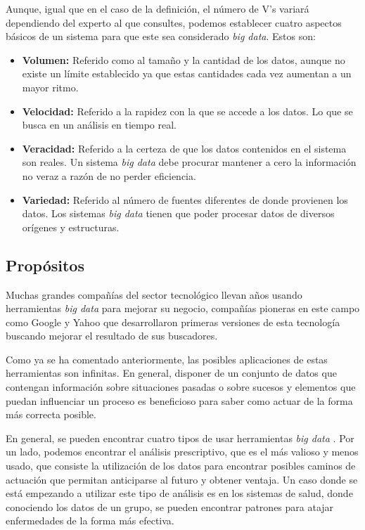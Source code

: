 Aunque, igual que en el caso de la definición, el número de V's variará dependiendo del experto al que consultes, podemos establecer cuatro aspectos básicos de un sistema para que este sea considerado \textit{big data}. Estos son:

\begin{itemize}
	\item \textbf{Volumen:} Referido como al tamaño y la cantidad de los datos, aunque no existe un límite establecido ya que estas cantidades cada vez aumentan a un mayor ritmo.
	
	\item \textbf{Velocidad:} Referido a la rapidez con la que se accede a los datos. Lo que se busca en un análisis en tiempo real.
	
	\item \textbf{Veracidad:} Referido a la certeza de que los datos contenidos en el sistema son reales. Un sistema \textit{big data} debe procurar mantener a cero la información no veraz a razón de no perder eficiencia.
	
	\item \textbf{Variedad:} Referido al número de fuentes diferentes de donde provienen los datos. Los sistemas \textit{big data} tienen que poder procesar datos de diversos orígenes y estructuras.
\end{itemize}

\clearpage
\subsection{Propósitos}
Muchas grandes compañías del sector tecnológico llevan años usando herramientas \textit{big data} para mejorar su negocio, compañías pioneras en este campo como Google y Yahoo que desarrollaron primeras versiones de esta tecnología buscando mejorar el resultado de sus buscadores.

Como ya se ha comentado anteriormente, las posibles aplicaciones de estas herramientas son infinitas. En general, disponer de un conjunto de datos que contengan información sobre situaciones pasadas o sobre sucesos y elementos que puedan influenciar un proceso es beneficioso para saber como actuar de la forma más correcta posible.

En general, se pueden encontrar cuatro tipos de usar herramientas \textit{big data} \cite{tipoAnalisis}. Por un lado, podemos encontrar el análisis prescriptivo, que es el más valioso y menos usado, que consiste la utilización de los datos para encontrar posibles caminos de actuación que permitan anticiparse al futuro y obtener ventaja. Un caso donde se está empezando a utilizar este tipo de análisis es en los sistemas de salud, donde conociendo los datos de un grupo, se pueden encontrar patrones para atajar enfermedades de la forma más efectiva.

